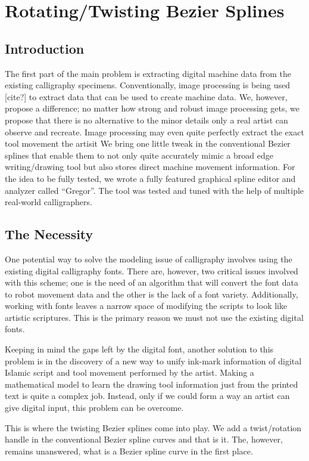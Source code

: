 \section{Rotating/Twisting Bezier Splines}

    \subsection{Introduction}
    The first part of the main problem is extracting digital machine data from the existing calligraphy specimens.  Conventionally, image processing is being used [cite?] to extract data that can be used to create machine data. We, however, propose a difference; no matter how strong and robust image processing gets, we propose that there is no alternative to the minor details only a real artist can observe and recreate. Image processing may even quite perfectly extract the exact tool movement the artisit We bring one little tweak in the conventional Bezier splines that enable them to not only quite accurately mimic a broad edge writing/drawing tool but also stores direct machine movement information. For the idea to be fully tested, we wrote a fully featured graphical spline editor and analyzer called “Gregor”. The tool was tested and tuned with the help of multiple real-world calligraphers.

    \subsection{The Necessity}
    One potential way to solve the modeling issue of calligraphy involves using the existing digital calligraphy fonts. There are, however, two critical issues involved with this scheme; one is the need of an algorithm that will convert the font data to robot movement data and the other is the lack of a font variety. Additionally, working with fonts leaves a narrow space of modifying the scripts to look like artistic scriptures. This is the primary reason we must not use the existing digital fonts.

    Keeping in mind the gaps left by the digital font, another solution to this problem is in the discovery of a new way to unify ink-mark information of digital Islamic script and tool movement performed by the artist. Making a mathematical model to learn the drawing tool information just from the printed text is quite a complex job. Instead, only if we could form a way an artist can give digital input, this problem can be overcome.

    This is where the twisting Bezier splines come into play. We add a twist/rotation handle in the conventional Bezier spline curves and that is it. The, however, remains unanswered, what is a Bezier spline curve in the first place.

